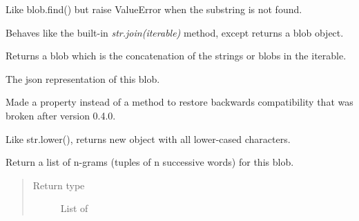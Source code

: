 \documentclass[letterpaper,10pt,english]{sphinxmanual}
\begin{document}
\begin{fulllineitems}
\begin{fulllineitems}
\label{api_reference:textblob_de.blob.TextBlobDE.index}
Like blob.find() but raise ValueError when the substring
is not found.

\end{fulllineitems}


\begin{fulllineitems}
\label{api_reference:textblob_de.blob.TextBlobDE.join}
Behaves like the built-in \emph{str.join(iterable)} method, except
returns a blob object.

Returns a blob which is the concatenation of the strings or blobs
in the iterable.

\end{fulllineitems}


\begin{fulllineitems}
\label{api_reference:textblob_de.blob.TextBlobDE.json}
The json representation of this blob.

Made  a property instead of a method to restore backwards
compatibility that was broken after version 0.4.0.

\end{fulllineitems}


\begin{fulllineitems}
\label{api_reference:textblob_de.blob.TextBlobDE.lower}
Like str.lower(), returns new object with all lower-cased characters.

\end{fulllineitems}


\begin{fulllineitems}
\label{api_reference:textblob_de.blob.TextBlobDE.ngrams}
Return a list of n-grams (tuples of n successive words) for this
blob.
\begin{quote}\begin{description}
\item[{Return type}] \leavevmode
List of {\hyperref[api_reference:textblob_de.blob.WordList]{}}


\end{description}
\end{quote}
\end{fulllineitems}
\end{fulllineitems}
\end{document}
